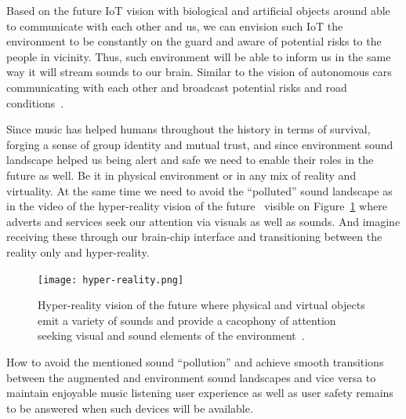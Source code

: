 \documentclass[sigchi]{acmart}
\begin{document}
Based on the future IoT vision with biological and artificial objects around able to communicate with each other and us, we can envision such IoT the environment to be constantly on the guard and aware of potential risks to the people in vicinity. Thus, such environment will be able to inform us in the same way it will stream sounds to our brain. Similar to the vision of autonomous cars communicating with each other and broadcast potential risks and road conditions~\cite{shankland20195gcars}. 

Since music has helped humans throughout the history in terms of survival, forging a sense of group identity and mutual trust, and since environment sound landscape helped us being alert and safe we need to enable their roles in the future as well. Be it in physical environment or in any mix of reality and virtuality. At the same time we need to avoid the ``polluted'' sound landscape as in the video of the hyper-reality vision of the future~\cite{matsuda2016hyperreality} visible on Figure~\ref{fig:hyper-reality} where adverts and services seek our attention via visuals as well as sounds. And imagine receiving these through our brain-chip interface and transitioning between the reality only and hyper-reality. 

\begin{figure}[hbt!]
  \centering
   \texttt{[image: hyper-reality.png]}
  \caption{Hyper-reality vision of the future where physical and virtual objects emit a variety of sounds and provide a cacophony of attention seeking visual and sound elements of the environment~\cite{matsuda2016hyperreality}.}
  \label{fig:hyper-reality}
\end{figure}

How to avoid the mentioned sound ``pollution'' and achieve smooth transitions between the augmented and environment sound landscapes and vice versa to maintain enjoyable music listening user experience as well as user safety remains to be answered when such devices will be available. 
\balance


\end{document}
